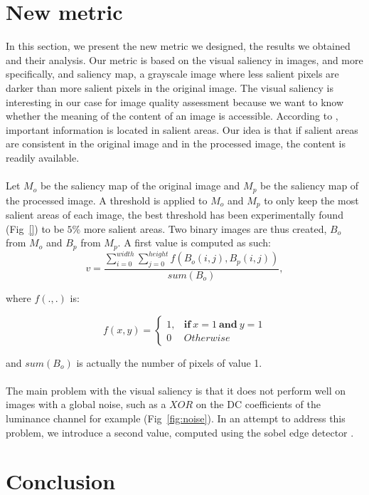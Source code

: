 \documentclass{article}
\begin{document}
\section{New metric}
\label{sec:metric}
In this section, we present the new metric we designed, the results we obtained and their analysis. Our metric is based on the visual saliency in images, and more specifically, and saliency map, a grayscale image where less salient pixels are darker than more salient pixels in the original image. The visual saliency is interesting in our case for image quality assessment because we want to know whether the meaning of the content of an image is accessible. According to \cite{itti1998model}, important information is located in salient areas. Our idea is that if salient areas are consistent in the original image and in the processed image, the content is readily available.

\paragraph*{}
Let $M_o$  be the saliency map of the original image and $M_p$ be the saliency map of the processed image. A threshold is applied to $M_o$ and $M_p$ to only keep the most salient areas of each image, the best threshold has been experimentally found (Fig~\ref{}) to be $5\%$ more salient areas. Two binary images are thus created, $B_o$ from $M_o$ and $B_p$ from $M_p$. A first value is computed as such:
$$
v = \frac{\sum_{i=0}^{width}\sum_{j=0}^{height}{f(B_o(i,j), B_p(i,j))}}{sum(B_o)},
$$

where $f(.,.)$ is:

$$
f(x,y) = \begin{cases}
    1, & \textbf{if}\ x = 1\ \textbf{and}\ y = 1\\ 
    0 & Otherwise
  \end{cases}
$$

and $sum(B_o)$ is actually the number of pixels of value 1.

\paragraph*{}

The main problem with the visual saliency is that it does not perform well on images with a global noise, such as a $XOR$ on the DC coefficients of the luminance channel for example (Fig~\ref{fig:noise}). In an attempt to address this problem, we introduce a second value, computed using the sobel edge detector \cite{}.

\section{Conclusion}
\label{sec:conclusion}

\newpage


\end{document}

